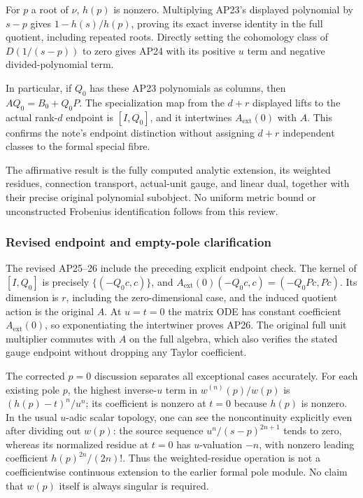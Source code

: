 \documentclass{article}
\begin{document}
For \(p\) a root of \(\nu\), \(h(p)\) is nonzero. Multiplying AP23's displayed polynomial by \(s-p\) gives \(1-h(s)/h(p)\), proving its exact inverse identity in the full quotient, including repeated roots. Directly setting the cohomology class of \(D(1/(s-p))\) to zero gives AP24 with its positive \(u\) term and negative divided-polynomial term.

In particular, if \(Q_0\) has these AP23 polynomials as columns, then \(A Q_0=B_0+Q_0 P\). The specialization map from the \(d+r\) displayed lifts to the actual rank-\(d\) endpoint is \([I,Q_0]\), and it intertwines \(A_{\mathrm{ext}}(0)\) with \(A\). This confirms the note's endpoint distinction without assigning \(d+r\) independent classes to the formal special fibre.

The affirmative result is the fully computed analytic extension, its weighted residues, connection transport, actual-unit gauge, and linear dual, together with their precise original polynomial subobject. No uniform metric bound or unconstructed Frobenius identification follows from this review.

\subsubsection{Revised endpoint and empty-pole clarification}\label{endpoint-analytic_pole_review--revised-endpoint-and-empty-pole-clarification}

The revised AP25--26 include the preceding explicit endpoint check. The kernel of \([I,Q_0]\) is precisely \(\{(-Q_0 c,c)\}\), and \(A_{\mathrm{ext}}(0)(-Q_0 c,c)=(-Q_0 Pc,Pc)\). Its dimension is \(r\), including the zero-dimensional case, and the induced quotient action is the original \(A\). At \(u=t=0\) the matrix ODE has constant coefficient \(A_{\mathrm{ext}}(0)\), so exponentiating the intertwiner proves AP26. The original full unit multiplier commutes with \(A\) on the full algebra, which also verifies the stated gauge endpoint without dropping any Taylor coefficient.

The corrected \(p=0\) discussion separates all exceptional cases accurately. For each existing pole \(p\), the highest inverse-\(u\) term in \(w^{(n)}(p)/w(p)\) is \((h(p)-t)^n/u^n\); its coefficient is nonzero at \(t=0\) because \(h(p)\) is nonzero. In the usual \(u\)-adic scalar topology, one can see the noncontinuity explicitly even after dividing out \(w(p)\): the source sequence \(u^n/(s-p)^{2n+1}\) tends to zero, whereas its normalized residue at \(t=0\) has \(u\)-valuation \(-n\), with nonzero leading coefficient \(h(p)^{2n}/(2n)!\). Thus the weighted-residue operation is not a coefficientwise continuous extension to the earlier formal pole module. No claim that \(w(p)\) itself is always singular is required.
\end{document}
